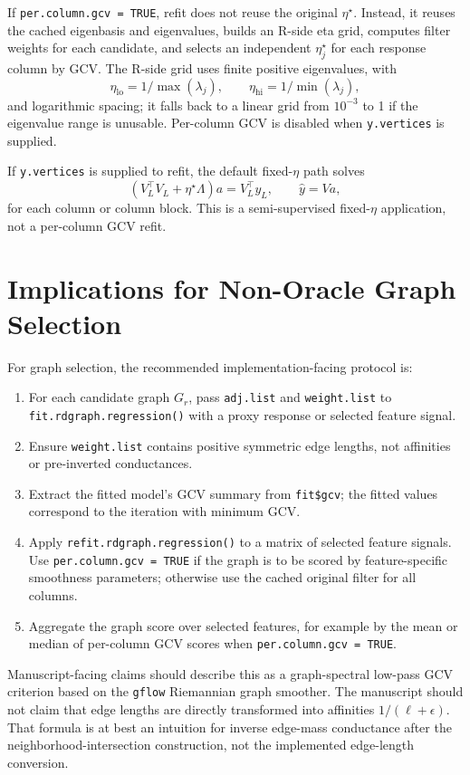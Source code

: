 \documentclass[11pt]{article}
\newcommand{\code}[1]{\texttt{#1}}
\begin{document}
If \code{per.column.gcv = TRUE}, refit does not reuse the original
\(\eta^\star\). Instead, it reuses the cached eigenbasis and eigenvalues, builds
an R-side eta grid, computes filter weights for each candidate, and selects an
independent \(\eta_j^\star\) for each response column by GCV. The R-side grid
uses finite positive eigenvalues, with
\[
  \eta_{\mathrm{lo}}=1/\max(\lambda_j),
  \qquad
  \eta_{\mathrm{hi}}=1/\min(\lambda_j),
\]
and logarithmic spacing; it falls back to a linear grid from \(10^{-3}\) to 1
if the eigenvalue range is unusable. Per-column GCV is disabled when
\code{y.vertices} is supplied.

If \code{y.vertices} is supplied to refit, the default fixed-\(\eta\) path
solves
\[
  (V_L^\top V_L+\eta^\star\Lambda)a=V_L^\top y_L,
  \qquad
  \hat y=Va,
\]
for each column or column block. This is a semi-supervised fixed-\(\eta\)
application, not a per-column GCV refit.

\section{Implications for Non-Oracle Graph Selection}

For graph selection, the recommended implementation-facing protocol is:
\begin{enumerate}[leftmargin=1.5em]
  \item For each candidate graph \(G_r\), pass \code{adj.list} and
  \code{weight.list} to \code{fit.rdgraph.regression()} with a proxy response or
  selected feature signal.
  \item Ensure \code{weight.list} contains positive symmetric edge lengths,
  not affinities or pre-inverted conductances.
  \item Extract the fitted model's GCV summary from \code{fit\$gcv}; the fitted
  values correspond to the iteration with minimum GCV.
  \item Apply \code{refit.rdgraph.regression()} to a matrix of selected feature
  signals. Use \code{per.column.gcv = TRUE} if the graph is to be scored by
  feature-specific smoothness parameters; otherwise use the cached original
  filter for all columns.
  \item Aggregate the graph score over selected features, for example by the
  mean or median of per-column GCV scores when \code{per.column.gcv = TRUE}.
\end{enumerate}

Manuscript-facing claims should describe this as a graph-spectral low-pass GCV
criterion based on the \code{gflow} Riemannian graph smoother. The manuscript
should not claim that edge lengths are directly transformed into affinities
\(1/(\ell+\epsilon)\). That formula is at best an intuition for inverse
edge-mass conductance after the neighborhood-intersection construction, not the
implemented edge-length conversion.
\end{document}
